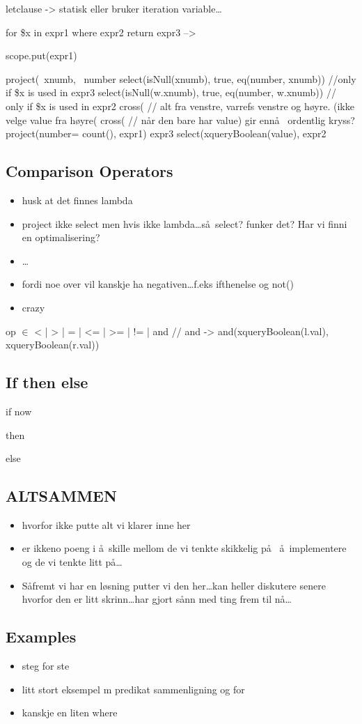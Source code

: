 letclause -> statisk eller bruker iteration variable\ldots

for \$x in expr1 where expr2 return expr3  -->

scope.put(expr1)

project(~xnumb, ~number
    select(isNull(xnumb), true, eq(number, xnumb))             
    //only if \$x is  used in expr3 
    select(isNull(w.xnumb), true, eq(number, w.xnumb))         
    // only if \$x is used in expr2 
        cross(                     
    // alt fra venstre, varrefs venstre og høyre. (ikke velge value fra h\o yre(
            cross(                                             
          //  n\aa r den bare har value) gir enn\aa~ ordentlig kryss?
                project(number= count(), 
                    expr1)
                expr3
        select(xqueryBoolean(value),                                  
            expr2

\subsection{Comparison Operators}
\label{sect:translation:mXr:compOps}

\begin{itemize}
  \item husk at det finnes lambda
  \item project ikke select men hvis ikke lambda\ldots s\aa~select? funker det? Har vi finni en optimalisering?
  \item \ldots
  \item fordi noe over vil kanskje ha negativen\ldots f.eks ifthenelse og not()
  \item crazy
\end{itemize}
op $\in$ {< | > | = | <= | >= | != | and }        // and ->
and(xqueryBoolean(l.val), xqueryBoolean(r.val))

\subsection{If then else}
\label{sect:translation:ifThenElse}
if
now

then

else

\subsection{ALTSAMMEN}
\begin{itemize}
  \item hvorfor ikke putte alt vi klarer inne her
  \item er ikkeno poeng i \aa~skille mellom de vi tenkte skikkelig p\aa~ \aa~implementere og de vi tenkte litt
  p\aa\ldots
  \item S\aa fremt vi har en l\o sning putter vi den her\ldots kan heller diskutere senere hvorfor den er litt
  skrinn\ldots har gjort s\aa nn med ting frem til n\aa\ldots
\end{itemize}

\subsection{Examples}
\label{sect:translation:mXr:markxremoveExamples}
\begin{itemize}
\item steg for ste
\item litt stort eksempel m predikat sammenligning og for
\item kanskje en liten where
\end{itemize}
